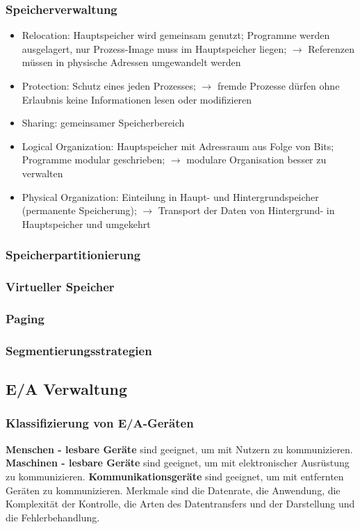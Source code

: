 \documentclass{article}
\begin{document}
\subsubsection{Speicherverwaltung}
    \begin{itemize}
        \item Relocation: Hauptspeicher wird gemeinsam genutzt; Programme werden ausgelagert, nur Prozess-Image muss im Hauptspeicher liegen; $\rightarrow$ Referenzen müssen in physische Adressen umgewandelt werden
        \item Protection: Schutz eines jeden Prozesses; $\rightarrow$ fremde Prozesse dürfen ohne Erlaubnis keine Informationen lesen oder modifizieren
        \item Sharing: gemeinsamer Speicherbereich 
        \item Logical Organization: Hauptspeicher mit Adressraum aus Folge von Bits; Programme modular geschrieben; $\rightarrow$ modulare Organisation besser zu verwalten 
        \item Physical Organization: Einteilung in Haupt- und Hintergrundspeicher (permanente Speicherung); $\rightarrow$ Transport der Daten von Hintergrund- in Hauptspeicher und umgekehrt
    \end{itemize}
\subsubsection{Speicherpartitionierung}
\subsubsection{Virtueller Speicher}
\subsubsection{Paging}
\subsubsection{Segmentierungsstrategien}
\subsection{E/A Verwaltung}
\subsubsection{Klassifizierung von E/A-Geräten}
    \textbf{Menschen - lesbare Geräte} sind geeignet, um mit Nutzern zu kommunizieren.\newline
    \textbf{Maschinen - lesbare Geräte} sind geeignet, um mit elektronischer Ausrüstung zu kommunizieren.\newline
    \textbf{Kommunikationsgeräte} sind geeignet, um mit entfernten Geräten zu kommunizieren.\newline
    Merkmale sind die Datenrate, die Anwendung, die Komplexität der Kontrolle, die Arten des Datentransfers und der Darstellung und die Fehlerbehandlung.
\end{document}
